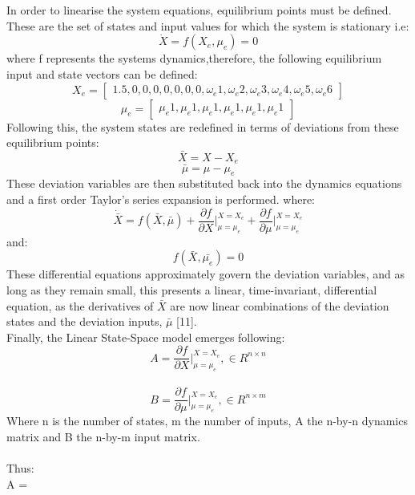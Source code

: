 \documentclass[12pt,a4paper,twoside]{report}
\begin{document}
					In order to linearise the system equations, equilibrium points must be defined. These are the set of states and input values for which the system is stationary i.e:
					\[\dot{X} = f(X_e,\mu_e) = 0\]
					where f represents the systems dynamics,therefore, the following equilibrium input and state vectors can be defined:
					$$
					X_e = 
					\begin{bmatrix}
						1.5,0,0,0,0,0,0,0,\omega_e1,\omega_e2,\omega_e3,\omega_e4,\omega_e5,\omega_e6
					\end{bmatrix}
					$$
					$$
					\mu_e = 
					\begin{bmatrix}
						\mu_e1,\mu_e1,\mu_e1,\mu_e1,\mu_e1,\mu_e1
					\end{bmatrix}
					$$
					Following this, the system states are redefined in terms of deviations from these equilibrium points:
					\[\bar{X} = X - X_e\] 
					\[\bar{\mu} = \mu - \mu_e\] 
					These deviation variables are then substituted back into the dynamics equations and a first order Taylor's series expansion is performed. where:
					\[
						\dot{\bar{X}} = f(\bar{X},\bar{\mu}) + \frac{\partial f}{\partial X}\bigg\vert_{\mu = \mu_e}^{X = X_e} + \frac{\partial f}{\partial \mu}\bigg\vert_{\mu = \mu_e}^{X = X_e}
					\]
					and:
					\[ f(\bar{X},\bar{\mu_e}) = 0 \]
					These differential equations approximately govern the deviation variables, and as long as they remain small, this presents a linear, time-invariant, differential equation, as the derivatives of $\bar{X}$ are now linear combinations of the deviation states and the deviation inputs, $\bar{\mu}$ [11]. 
					\\
					Finally, the Linear State-Space model emerges following:
					\\
					\[
						A = \frac{\partial f}{\partial X}\bigg\vert_{\mu = \mu_e}^{X = X_e}, \in R ^{n\times n}
					\] 
					\\
					\[ 
						B = \frac{\partial f}{\partial \mu}\bigg\vert_{\mu = \mu_e}^{X = X_e} , \in R ^{n\times m}
					\]
					Where n is the number of states, m the number of inputs, A the n-by-n dynamics matrix and B the n-by-m input matrix.
					\\ \\
					Thus:
					\\
					\setcounter{MaxMatrixCols}{15}
					A = 
\end{document}

